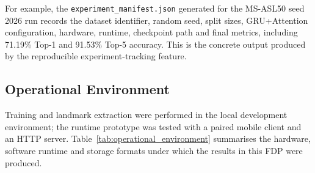 For example, the \texttt{experiment\_manifest.json} generated for the MS-ASL50 seed 2026 run
records the dataset identifier, random seed, split sizes, GRU+Attention configuration, hardware,
runtime, checkpoint path and final metrics, including 71.19\% Top-1 and 91.53\% Top-5 accuracy.
This is the concrete output produced by the reproducible experiment-tracking feature.

\subsection{Operational Environment}
\label{sec:operational_environment}

Training and landmark extraction were performed in the local development environment; the runtime
prototype was tested with a paired mobile client and an HTTP server.
Table~\ref{tab:operational_environment} summarises the hardware, software runtime and storage
formats under which the results in this FDP were produced.


